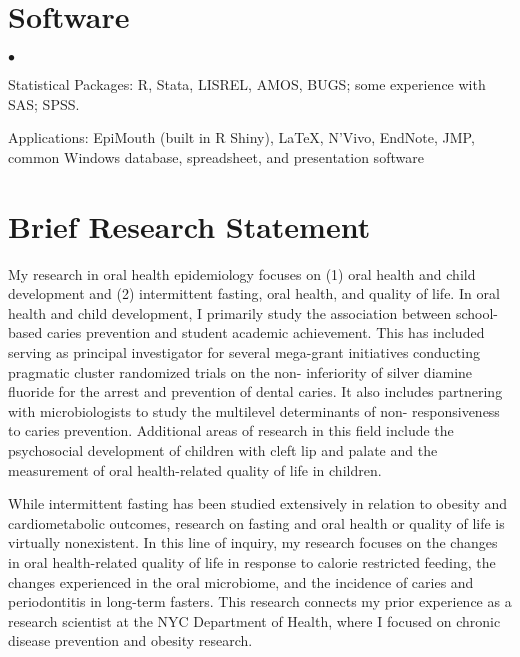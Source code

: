 \documentclass[margin,line]{res}
\newenvironment{list2}{
  \begin{list}{$\bullet$}{%
      \setlength{\itemsep}{0in}
      \setlength{\parsep}{0in} \setlength{\parskip}{0in}
      \setlength{\topsep}{0in} \setlength{\partopsep}{0in} 
      \setlength{\leftmargin}{0.2in}}}{\end{list}}
\begin{document}
\begin{resume}
\section{\sc Software} 
\begin{list2}
\item Statistical Packages:  R, Stata, LISREL, AMOS, BUGS; some experience
  with SAS; SPSS.
\item Applications: EpiMouth (built in R Shiny), \LaTeX, N'Vivo, EndNote, JMP, common Windows
  database, spreadsheet, and presentation software
\end{list2}


\section{\sc Brief Research Statement}
My research in oral health epidemiology focuses on (1) oral health and child development 
and (2) intermittent fasting, oral health, and quality of life. In oral health and child 
development, I primarily study the association between school-based caries prevention and 
student academic achievement. This has included serving as principal investigator for 
several mega-grant initiatives conducting pragmatic cluster randomized trials on the non-
inferiority of silver diamine fluoride for the arrest and prevention of dental caries. It also 
includes partnering with microbiologists to study the multilevel determinants of non-
responsiveness to caries prevention. Additional areas of research in this field include the 
psychosocial development of children with cleft lip and palate and the measurement of oral 
health-related quality of life in children. 

While intermittent fasting has been studied extensively in relation to obesity and cardiometabolic outcomes, research on fasting and oral health or quality of life is virtually nonexistent. In this line of inquiry, my research focuses on the changes in oral health-related quality of life in response to calorie restricted feeding, the changes experienced in the oral microbiome, and the incidence of caries and periodontitis in long-term fasters. This research connects my prior experience as a research scientist at the NYC Department of Health, where I focused on chronic disease prevention and obesity research.




\end{resume}
\end{document}
